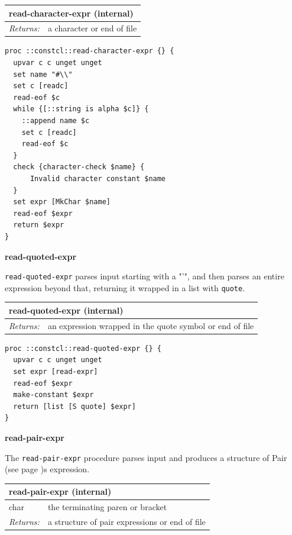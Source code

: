 \documentclass[twoside,9pt]{report}
\begin{document}
\begin{tabular}{ |l l| }
\hline
\multicolumn{2}{|l|}{read-character-expr (internal)} \\
\hline
\textit{Returns:} & a character or end of file \\
\hline
\end{tabular}

\noindent\makebox[\linewidth]{\rule{\linewidth}{0.4pt}}
\begin{lstlisting}
proc ::constcl::read-character-expr {} {
  upvar c c unget unget
  set name "#\\"
  set c [readc]
  read-eof $c
  while {[::string is alpha $c]} {
    ::append name $c
    set c [readc]
    read-eof $c
  }
  check {character-check $name} {
      Invalid character constant $name
  }
  set expr [MkChar $name]
  read-eof $expr
  return $expr
}
\end{lstlisting}
\noindent\makebox[\linewidth]{\rule{\linewidth}{0.4pt}}

\textbf{read-quoted-expr}


\texttt{read-quoted-expr} parses input starting with a "'", and then parses an entire expression beyond that, returning it wrapped in a list with \texttt{quote}.

\begin{tabular}{ |l l| }
\hline
\multicolumn{2}{|l|}{read-quoted-expr (internal)} \\
\hline
\textit{Returns:} & an expression wrapped in the quote symbol or end of file \\
\hline
\end{tabular}

\noindent\makebox[\linewidth]{\rule{\linewidth}{0.4pt}}
\begin{lstlisting}
proc ::constcl::read-quoted-expr {} {
  upvar c c unget unget
  set expr [read-expr]
  read-eof $expr
  make-constant $expr
  return [list [S quote] $expr]
}
\end{lstlisting}
\noindent\makebox[\linewidth]{\rule{\linewidth}{0.4pt}}

\textbf{read-pair-expr}


The \texttt{read-pair-expr} procedure parses input and produces a structure of Pair (see page \pageref{pairs-and-lists})s expression.

\begin{tabular}{ |l l| }
\hline
\multicolumn{2}{|l|}{read-pair-expr (internal)} \\
\hline
char & the terminating paren or bracket \\
\textit{Returns:} & a structure of pair expressions or end of file \\
\hline
\end{tabular}
\end{document}
